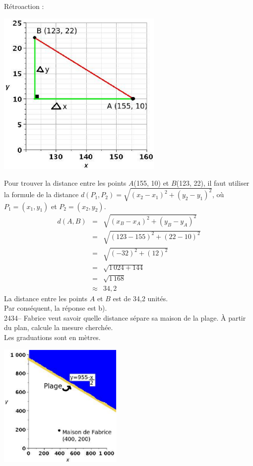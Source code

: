 \documentclass[letterpaper, 12pt]{article}
\begin{document}
R\'etroaction :\\
\begin{center}
 \includegraphics[width=8cm,bb=14 14 415 415]{Q2433r.eps}
\end{center}
Pour trouver la distance entre les points $A$(155, 10) et $B$(123, 22), il faut utiliser la formule de la distance $d(P_{1}, P_{2})=\sqrt{(x_{2}-x_{1})^{2}+(y_{2}-y_{1})^{2}}$, o\`u $P_{1}=(x_{1},y_{1})$ et $P_{2}=(x_{2},y_{2})$.
\begin{eqnarray*}
 d(A, B)&=&\sqrt{(x_{B}-x_{A})^{2}+(y_{B}-y_{A})^{2}}\\
&=&\sqrt{(123-155)^{2}+(22-10)^{2}}\\
&=&\sqrt{(-32)^{2}+(12)^{2}}\\
&=&\sqrt{1\,024+144}\\
&=&\sqrt{1\,168}\\
&\approx&34,2
\end{eqnarray*}
La distance entre les points $A$ et $B$ est de 34,2 unit\'es.\\
Par cons\'equent, la r\'eponse est b).\\

2434-- Fabrice veut savoir quelle distance s\'epare sa maison de la plage. \`A partir du plan, calcule la mesure cherch\'ee.\\
Les graduations sont en m\`etres.\\
\begin{center}
 \includegraphics[width=6cm,bb=14 14 582 582]{Q2434q.eps}
\end{center}
\end{document}
